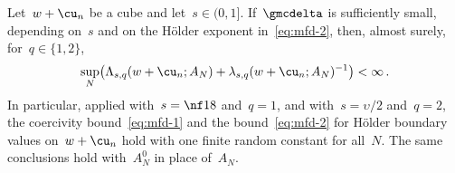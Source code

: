 \documentclass[11pt]{amsart}
\begin{document}
\begin{lemma}
\label{mfd:lem-as-coarse}
Let~$w+\cu_n$ be a cube and let~$s\in(0,1]$. If~$\gmcdelta$ is sufficiently small, depending on~$s$ and on the H\"older exponent in~\eqref{eq:mfd-2}, then, almost surely, for~$q\in\{1,2\}$,
\begin{equation*}
	\sup_N\bigl(\Lambda_{s,q}(w+\cu_n;A_N)
	+\lambda_{s,q}(w+\cu_n;A_N)^{-1}\bigr)<\infty\,.
\end{equation*}
In particular, applied with~$s=\nf18$ and~$q=1$, and with~$s=\upsilon/2$ and~$q=2$, the coercivity bound~\eqref{eq:mfd-1} and the bound~\eqref{eq:mfd-2} for H\"older boundary values on~$w+\cu_n$ hold with one finite random constant for all~$N$. The same conclusions hold with~$A_N^0$ in place of~$A_N$.
\end{lemma}
\end{document}
